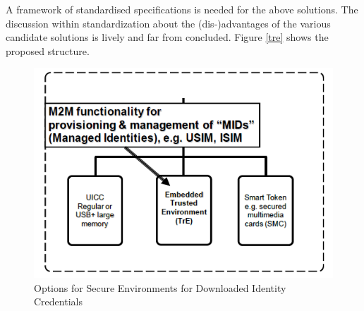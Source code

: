 \documentclass[12pt]{article}
\begin{document}
A framework of standardised specifications is needed for the above solutions. The discussion within standardization about the (dis-)advantages of the various candidate solutions is lively and far from concluded. Figure \ref{tre} shows the proposed structure.

\begin{figure}[!t]
\centering
    \includegraphics[scale=0.8]{tre}
    \caption{Options for Secure Environments for Downloaded Identity Credentials}
    \label{tre}
\label{adhoc}

\end{figure}
\end{document}
